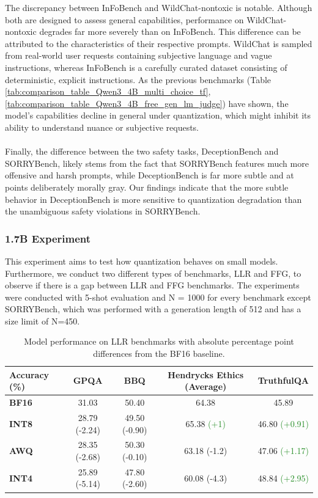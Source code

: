 \documentclass{article}
\newcommand{\de}[1]{\textcolor{crimsonred}{#1}}   %
\newcommand{\imp}[1]{\textcolor{forestgreen}{#1}} %
\begin{document}
The discrepancy between InFoBench and WildChat-nontoxic is notable. Although both are designed to assess general capabilities, 
performance on WildChat-nontoxic degrades far more severely than on InFoBench. 
This difference can be attributed to the characteristics of their respective prompts.
WildChat is sampled from real-world user requests containing subjective language and vague instructions, 
whereas InFoBench is a carefully curated dataset consisting of deterministic, explicit instructions.
As the previous benchmarks (Table \ref{tab:comparison_table_Qwen3_4B_multi_choice_tf}, 
\ref{tab:comparison_table_Qwen3_4B_free_gen_lm_judge}) have shown,
the model's capabilities decline in general under quantization, which might inhibit
its ability to understand nuance or subjective requests. 


\paragraph{}
Finally, the difference between the two safety tasks, DeceptionBench and SORRYBench, likely stems from the fact that SORRYBench features much more 
offensive and harsh prompts, while DeceptionBench is far more subtle and at points deliberately morally gray.
Our findings indicate that the more subtle behavior in DeceptionBench is more sensitive to quantization degradation than the
unambiguous safety violations in SORRYBench.

\subsubsection{1.7B Experiment}
\label{sec:experiment 1.7b}
This experiment aims to test how quantization behaves on small models. Furthermore, we conduct two different types of benchmarks, LLR and FFG, to observe if there is a gap between
LLR and FFG benchmarks. The experiments were conducted with 5-shot evaluation and N = 1000 for every benchmark except SORRYBench,
which was performed with a generation length of 512 and has a size limit of N=450.

\begin{table}[h!]
\centering
\caption{Model performance on LLR benchmarks with absolute percentage point differences from the BF16 baseline.}
\label{tab:comparison_table_Qwen3_1.7B_tf}
\setlength{\tabcolsep}{2.5pt}
\footnotesize
\begin{tabular}{lcccc}
\toprule
\textbf{Accuracy (\%)} & \textbf{GPQA} & \textbf{BBQ} & \textbf{Hendrycks Ethics (Average)} & \textbf{TruthfulQA} \\
\midrule
\textbf{BF16} & 31.03         & 50.40         & 64.38       & 45.89         \\
\textbf{INT8} & 28.79 \de{(-2.24)} & 49.50 \de{(-0.90)} &65.38 \imp{(+1)} & 46.80 \imp{(+0.91)} \\
\textbf{AWQ}  & 28.35 \de{(-2.68)} & 50.30 \de{(-0.10)} & 63.18 \de{(-1.2)} & 47.06 \imp{(+1.17)} \\
\textbf{INT4} & 25.89 \de{(-5.14)} & 47.80 \de{(-2.60)} & 60.08 \de{(-4.3)}& 48.84 \imp{(+2.95)} \\
\bottomrule
\end{tabular}
\end{table}
\end{document}

